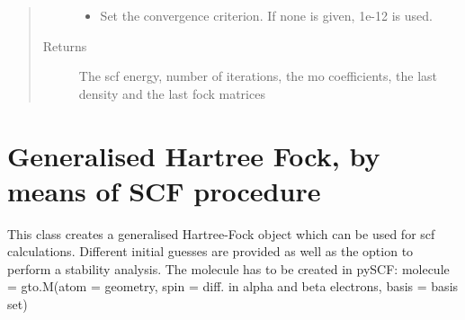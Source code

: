 \documentclass[letterpaper,10pt,english]{sphinxmanual}
\begin{document}
\begin{fulllineitems}
\begin{fulllineitems}
\begin{quote}
\begin{description}
\begin{itemize}
\item {} 
 \textendash{} Set the convergence criterion. If none is given, 1e-12 is used.

\end{itemize}

\item[{Returns}] \leavevmode
The scf energy, number of iterations, the mo coefficients, the last density and the last fock matrices

\end{description}\end{quote}

\end{fulllineitems}


\end{fulllineitems}

\label{\detokenize{GHF:module-hf.HartreeFock.GHF}}

\chapter{Generalised Hartree Fock, by means of SCF procedure}
\label{\detokenize{GHF:generalised-hartree-fock-by-means-of-scf-procedure}}\label{\detokenize{GHF::doc}}
This class creates a generalised Hartree-Fock object which can be used for scf calculations. Different initial guesses
are provided as well as the option to perform a stability analysis.
The molecule has to be created in pySCF:
molecule = gto.M(atom = geometry, spin = diff. in alpha and beta electrons, basis = basis set)
\end{document}
